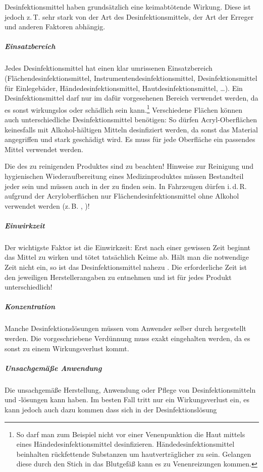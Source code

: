 \clearpage %
{%
Desinfektionsmittel haben grundsätzlich eine keimabtötende
Wirkung. Diese ist jedoch z.\,T. sehr stark von der Art des
Desinfektionsmittels, der Art der Erreger und anderen
Faktoren abhängig.

\subparagraph{Einsatzbereich} 
Jedes Desinfektionsmittel hat einen klar umrissenen
Einsatzbereich (Flächendesinfektionsmittel,
Instrumentendesinfektionsmittel, Desinfektionsmittel für
Einlegebäder, Händedesinfektionsmittel,
Hautdesinfektionsmittel, \ldots{}). Ein Desinfektionsmittel
darf nur im dafür vorgesehenen Bereich verwendet werden, da
es sonst wirkungslos oder schädlich sein kann.\footnote{So
darf man zum Beispiel nicht vor einer Venenpunktion die Haut
mittels eines Händedesinfektionsmittel desinfizieren.
Händedesinfektionsmittel beinhalten rückfettende Substanzen
um hautverträglicher zu sein. Gelangen diese durch den Stich
in das Blutgefäß kann es zu Venenreizungen kommen.}
Verschiedene Flächen können auch unterschiedliche
Desinfektionsmittel benötigen: So dürfen Acryl-Oberflächen
keinesfalls mit Alkohol-hältigen Mitteln desinfiziert werden,
da sonst das Material angegriffen und stark geschädigt wird.
Es muss für jede Oberfläche ein passendes Mittel verwendet
werden.

Die  des zu reinigenden
Produktes sind zu beachten! Hinweise zur Reinigung und
hygienischen Wiederaufbereitung eines Medizinproduktes
müssen Bestandteil  jeder  sein und müssen
auch in der  zu finden sein.
In Fahrzeugen dürfen i.\,d.\,R. aufgrund der
Acryloberflächen nur Flächendesinfektionsmittel ohne Alkohol
verwendet werden (z.\,B. ,
)!


\subparagraph{Einwirkzeit} Der wichtigste Faktor ist die
Einwirkzeit: Erst nach einer gewissen Zeit beginnt das Mittel
zu wirken und tötet tatsächlich Keime ab. Hält man die
notwendige Zeit nicht ein, so ist das Desinfektionsmittel
nahezu . Die erforderliche Zeit ist den
jeweiligen Herstellerangaben zu entnehmen und ist für jedes
Produkt unterschiedlich!

\subparagraph{Konzentration} Manche Desinfektionslösungen
müssen vom Anwender selber durch  hergestellt werden.  Die vorgeschriebene
Verdünnung muss exakt eingehalten werden, da es sonst zu
einem Wirkungsverlust kommt.


\subparagraph{Unsachgemäße Anwendung} Die unsachgemäße
Herstellung, Anwendung oder Pflege von Desinfektionsmitteln
und -lösungen kann  haben. Im besten
Fall tritt nur ein Wirkungsverlust ein, es kann jedoch auch
dazu kommen dass sich in der Desinfektionslösung

}
